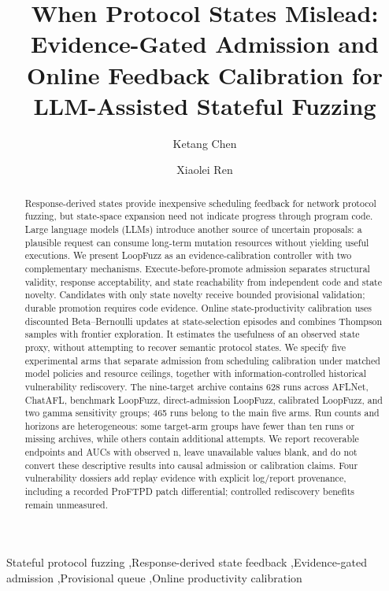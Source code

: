 \documentclass[final,5p,times,number]{elsarticle}
\begin{document}
\raggedbottom
\begin{frontmatter}
\title{When Protocol States Mislead: Evidence-Gated Admission and Online Feedback Calibration for LLM-Assisted Stateful Fuzzing}
\author[inst1]{Ketang Chen}
\author[inst1]{Xiaolei Ren}
\begin{abstract}
Response-derived states provide inexpensive scheduling feedback for network protocol fuzzing, but state-space expansion need not indicate progress through program code. Large language models (LLMs) introduce another source of uncertain proposals: a plausible request can consume long-term mutation resources without yielding useful executions. We present LoopFuzz as an evidence-calibration controller with two complementary mechanisms. Execute-before-promote admission separates structural validity, response acceptability, and state reachability from independent code and state novelty. Candidates with only state novelty receive bounded provisional validation; durable promotion requires code evidence. Online state-productivity calibration uses discounted Beta--Bernoulli updates at state-selection episodes and combines Thompson samples with frontier exploration. It estimates the usefulness of an observed state proxy, without attempting to recover semantic protocol states. We specify five experimental arms that separate admission from scheduling calibration under matched model policies and resource ceilings, together with information-controlled historical vulnerability rediscovery. The nine-target archive contains 628 runs across AFLNet, ChatAFL, benchmark LoopFuzz, direct-admission LoopFuzz, calibrated LoopFuzz, and two gamma sensitivity groups; 465 runs belong to the main five arms. Run counts and horizons are heterogeneous: some target-arm groups have fewer than ten runs or missing archives, while others contain additional attempts. We report recoverable endpoints and AUCs with observed n, leave unavailable values blank, and do not convert these descriptive results into causal admission or calibration claims. Four vulnerability dossiers add replay evidence with explicit log/report provenance, including a recorded ProFTPD patch differential; controlled rediscovery benefits remain unmeasured.
\end{abstract}
\begin{keyword}
Stateful protocol fuzzing \sep Response-derived state feedback \sep Evidence-gated admission \sep Provisional queue \sep Online productivity calibration
\end{keyword}
\end{frontmatter}
\end{document}

